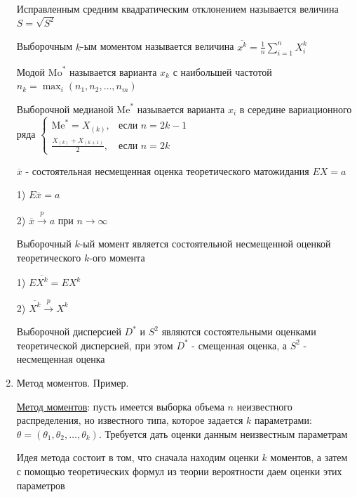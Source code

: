 \begin{enumerate}
    \Defs Исправленным средним квадратическим отклонением называется величина $S = \sqrt{S^2}$

    \Defs Выборочным $k$-ым моментом называется величина $\overline{x^k} = \frac{1}{n} \sum_{i = 1}^n X_i^k$

    \Defs Модой $\mathrm{Mo}^*$ называется варианта $x_k$ с наибольшей частотой $n_k = \max_i (n_1, n_2, \dots, n_m)$

    \Defs Выборочной медианой $\mathrm{Me}^*$ называется варианта $x_i$ в середине вариационного ряда $\begin{cases}\mathrm{Me}^* = 
    X_{(k)}, & \text{если } n = 2k - 1 \\ \frac{X_{(k)} + X_{(k + 1)}}{2}, & \text{если } n = 2k\end{cases}$
    
    \begin{MyTheorem}
        \Ths $\overline{x}$ - состоятельная несмещенная оценка теоретического матожидания $EX = a$
    
        1) $E \overline{x} = a$
    
        2) $\overline{x} \overset{p}{\longrightarrow} a$ при $n \to \infty$
    \end{MyTheorem}
    
    \begin{MyTheorem}
        \Ths Выборочный $k$-ый момент является состоятельной несмещенной оценкой теоретического $k$-ого момента
    
        1) $E \overline{X^k} = E X^k$
    
        2) $\overline{X^k} \overset{p}{\longrightarrow} X^k$
    \end{MyTheorem}
    
    \begin{MyTheorem}
        \Ths Выборочной дисперсией $D^*$ и $S^2$ являются состоятельными оценками теоретической дисперсией, при этом $D^*$ - смещенная оценка, а $S^2$ - несмещенная оценка
    \end{MyTheorem}

    \item Метод моментов. Пример.

    \hyperlink{method_of_moments}{Метод моментов}: пусть имеется выборка объема $n$ неизвестного распределения, но известного типа,
    которое задается $k$ параметрами: $\theta = (\theta_1, \theta_2, \dots, \theta_k)$. Требуется дать оценки данным
    неизвестным параметрам

    Идея метода состоит в том, что сначала находим оценки $k$ моментов, а затем с помощью теоретических формул
    из теории вероятности даем оценки этих параметров


\end{enumerate}
